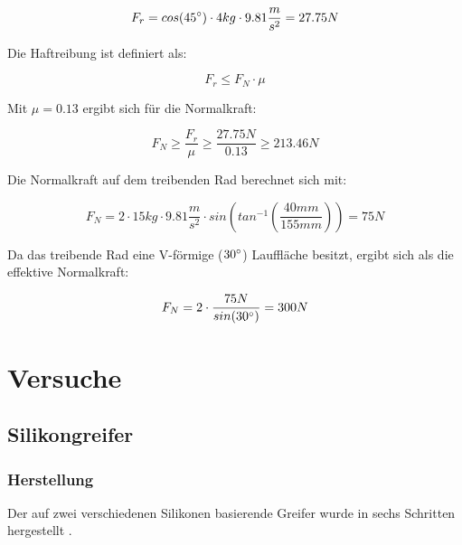 \begin{equation}
F_r = cos(45\degree) \cdot 4kg \cdot 9.81 \frac{m}{s^2} = 27.75N
\end{equation}

Die Haftreibung ist definiert als:

\begin{equation}
F_r \leq F_N \cdot \mu
\end{equation}

Mit $\mu = 0.13$ ergibt sich für die Normalkraft:

\begin{equation}
F_N \geq \frac{F_r}{\mu} \geq \frac{27.75N}{0.13} \geq 213.46N
\end{equation}

Die Normalkraft auf dem treibenden Rad berechnet sich mit:

\begin{equation}
F_N = 2 \cdot 15kg \cdot 9.81 \frac{m}{s^2} \cdot sin(tan^{-1}(\frac{40mm}{155mm})) = 75N
\end{equation}

Da das treibende Rad eine V-förmige ($30\degree$) Lauffläche besitzt, ergibt sich als die effektive Normalkraft:

\begin{equation}
F_N = 2 \cdot \frac{75N}{sin(30\degree)} = 300N
\end{equation}

\section{Versuche}
\label{app:versuche}

\subsection{Silikongreifer}

\subsubsection{Herstellung}
\label{app:herstellung-silikongreifer}

Der auf zwei verschiedenen Silikonen basierende Greifer wurde in sechs Schritten hergestellt . 

